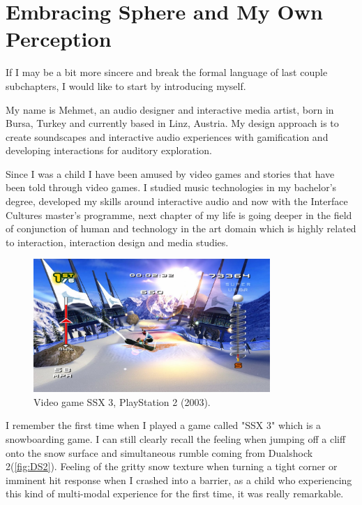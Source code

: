     \section{Embracing Sphere and My Own Perception} 
    If I may be a bit more sincere and break the formal language of last couple subchapters, I would like to start by introducing myself.\par 
    
    My name is Mehmet, an audio designer and interactive media artist, born in Bursa, Turkey and currently based in Linz, Austria. My design approach is to create soundscapes and interactive audio experiences with gamification and developing interactions for auditory exploration.\par

    Since I was a child I have been amused by video games and stories that have been told through video games. I studied music technologies in my bachelor's degree, developed my skills around interactive audio and now with the Interface Cultures master's programme, next chapter of my life is going deeper in the field of conjunction of human and technology in the art domain which is highly related to interaction, interaction design and media studies.

    \begin{figure}[H]
    \centering
    \includegraphics[width=0.8\textwidth]{images/ssx3}
    \caption{Video game SSX 3, PlayStation 2 (2003).}
    \label{fig:SSX3}
    \end{figure}

    I remember the first time when I played a game called "SSX 3" which is a snowboarding game. I can still clearly recall the feeling when jumping off a cliff onto the snow surface and simultaneous rumble coming from Dualshock 2(\ref{fig:DS2}). Feeling of the gritty snow texture when turning a tight corner or imminent hit response when I crashed into a barrier, as a child who experiencing this kind of multi-modal experience for the first time, it was really remarkable.\par

